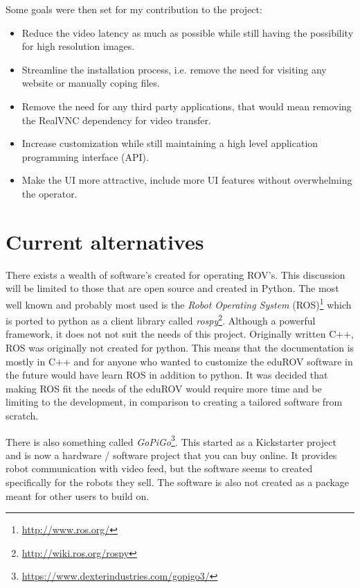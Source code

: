 Some goals were then set for my contribution to the project:

\begin{itemize}
\item Reduce the video latency as much as possible while still having the possibility for high resolution images.

\item Streamline the installation process, i.e. remove the need for visiting any website or manually coping files.

\item Remove the need for any third party applications, that would mean removing the RealVNC dependency for video transfer.

\item Increase customization while still maintaining a high level application programming interface (API).

\item Make the UI more attractive, include more UI features without overwhelming the operator.
\end{itemize}

\section{Current alternatives}

There exists a wealth of software's created for operating ROV's. This discussion will be limited to those that are open source and created in Python. The most well known and probably most used is the \emph{Robot Operating System} (ROS)\footnote{\url{http://www.ros.org/}} which is ported to python as a client library called \emph{rospy}\footnote{\url{http://wiki.ros.org/rospy}}. Although a powerful framework, it does not not suit the needs of this project. Originally written C++, ROS was originally not created for python. This means that the documentation is mostly in C++ and for anyone who wanted to customize the eduROV software in the future would have learn ROS in addition to python. It was decided that making ROS fit the needs of the eduROV would require more time and be limiting to the development, in comparison to creating a tailored software from scratch.

There is also something called \emph{GoPiGo}\footnote{\url{https://www.dexterindustries.com/gopigo3/}}. This started as a Kickstarter project and is now a hardware / software project that you can buy online. It provides robot communication with video feed, but the software seems to created specifically for the robots they sell. The software is also not created as a package meant for other users to build on.

